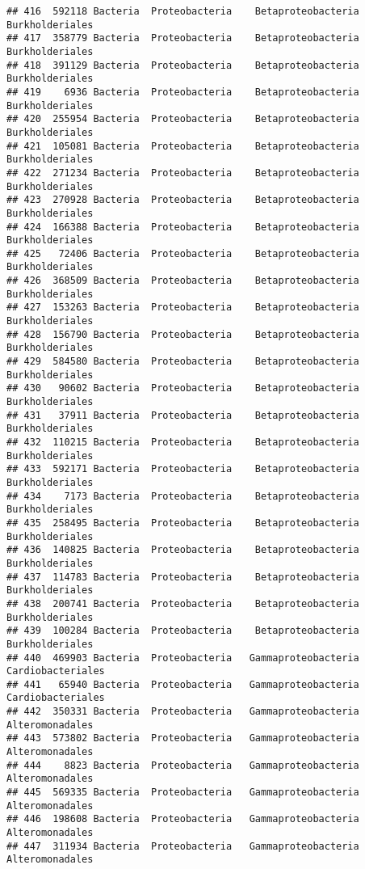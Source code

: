\documentclass[
]{article}
\begin{document}
\begin{verbatim}
## 416  592118 Bacteria  Proteobacteria    Betaproteobacteria     Burkholderiales
## 417  358779 Bacteria  Proteobacteria    Betaproteobacteria     Burkholderiales
## 418  391129 Bacteria  Proteobacteria    Betaproteobacteria     Burkholderiales
## 419    6936 Bacteria  Proteobacteria    Betaproteobacteria     Burkholderiales
## 420  255954 Bacteria  Proteobacteria    Betaproteobacteria     Burkholderiales
## 421  105081 Bacteria  Proteobacteria    Betaproteobacteria     Burkholderiales
## 422  271234 Bacteria  Proteobacteria    Betaproteobacteria     Burkholderiales
## 423  270928 Bacteria  Proteobacteria    Betaproteobacteria     Burkholderiales
## 424  166388 Bacteria  Proteobacteria    Betaproteobacteria     Burkholderiales
## 425   72406 Bacteria  Proteobacteria    Betaproteobacteria     Burkholderiales
## 426  368509 Bacteria  Proteobacteria    Betaproteobacteria     Burkholderiales
## 427  153263 Bacteria  Proteobacteria    Betaproteobacteria     Burkholderiales
## 428  156790 Bacteria  Proteobacteria    Betaproteobacteria     Burkholderiales
## 429  584580 Bacteria  Proteobacteria    Betaproteobacteria     Burkholderiales
## 430   90602 Bacteria  Proteobacteria    Betaproteobacteria     Burkholderiales
## 431   37911 Bacteria  Proteobacteria    Betaproteobacteria     Burkholderiales
## 432  110215 Bacteria  Proteobacteria    Betaproteobacteria     Burkholderiales
## 433  592171 Bacteria  Proteobacteria    Betaproteobacteria     Burkholderiales
## 434    7173 Bacteria  Proteobacteria    Betaproteobacteria     Burkholderiales
## 435  258495 Bacteria  Proteobacteria    Betaproteobacteria     Burkholderiales
## 436  140825 Bacteria  Proteobacteria    Betaproteobacteria     Burkholderiales
## 437  114783 Bacteria  Proteobacteria    Betaproteobacteria     Burkholderiales
## 438  200741 Bacteria  Proteobacteria    Betaproteobacteria     Burkholderiales
## 439  100284 Bacteria  Proteobacteria    Betaproteobacteria     Burkholderiales
## 440  469903 Bacteria  Proteobacteria   Gammaproteobacteria   Cardiobacteriales
## 441   65940 Bacteria  Proteobacteria   Gammaproteobacteria   Cardiobacteriales
## 442  350331 Bacteria  Proteobacteria   Gammaproteobacteria     Alteromonadales
## 443  573802 Bacteria  Proteobacteria   Gammaproteobacteria     Alteromonadales
## 444    8823 Bacteria  Proteobacteria   Gammaproteobacteria     Alteromonadales
## 445  569335 Bacteria  Proteobacteria   Gammaproteobacteria     Alteromonadales
## 446  198608 Bacteria  Proteobacteria   Gammaproteobacteria     Alteromonadales
## 447  311934 Bacteria  Proteobacteria   Gammaproteobacteria     Alteromonadales

\end{verbatim}
\end{document}
